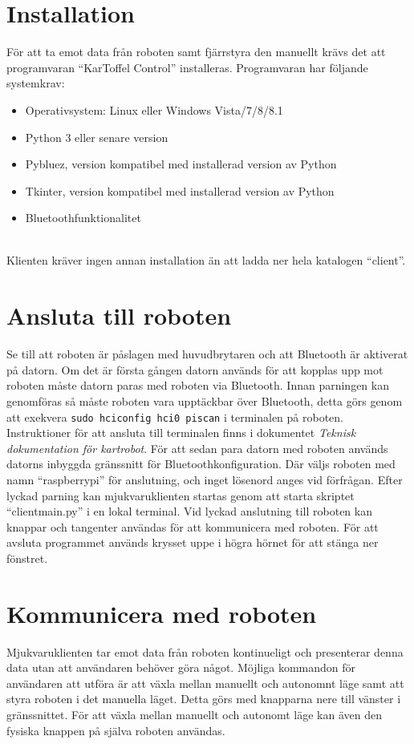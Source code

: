 \documentclass{article}
\begin{document}
\section{Installation}
För att ta emot data från roboten samt fjärrstyra den manuellt krävs det att programvaran ``KarToffel Control'' installeras. Programvaran har följande systemkrav:
\begin{itemize}
    \item Operativsystem: Linux eller Windows Vista/7/8/8.1
    \item Python 3 eller senare version
    \item Pybluez, version kompatibel med installerad version av Python
    \item Tkinter, version kompatibel med installerad version av Python
    \item Bluetoothfunktionalitet
\end{itemize}
\ \\
Klienten kräver ingen annan installation än att ladda ner hela katalogen ``client''.

\clearpage
\section{Ansluta till roboten}
Se till att roboten är påslagen med huvudbrytaren och att Bluetooth är aktiverat på datorn. Om det är första gången datorn används för att kopplas upp mot roboten måste datorn paras med roboten via Bluetooth.
\newline\newline
Innan parningen kan genomföras så måste roboten vara upptäckbar över Bluetooth, detta görs genom att exekvera \colorbox{backcolour}{\lstinline{sudo hciconfig hci0 piscan}} i terminalen på roboten. Instruktioner för att ansluta till terminalen finns i dokumentet \textit{Teknisk dokumentation för kartrobot}.
\newline\newline
För att sedan para datorn med roboten används datorns inbyggda gränssnitt för Bluetoothkonfiguration. Där väljs roboten med namn ``raspberrypi'' för anslutning, och inget lösenord anges vid förfrågan. Efter lyckad parning kan mjukvaruklienten startas genom att starta skriptet ``client\textunderscore main.py'' i en lokal terminal. Vid lyckad anslutning till roboten kan knappar och tangenter användas för att kommunicera med roboten. För att avsluta programmet används krysset uppe i högra hörnet för att stänga ner fönstret.

\clearpage
\section{Kommunicera med roboten}
Mjukvaruklienten tar emot data från roboten kontinueligt och presenterar denna data utan att användaren behöver göra något.
Möjliga kommandon för användaren att utföra är att växla mellan manuellt och autonomnt läge samt att styra roboten i det manuella läget. Detta görs med knapparna nere till vänster i gränssnittet.
För att växla mellan manuellt och autonomt läge kan även den fysiska knappen på själva roboten användas. 
\end{document}
